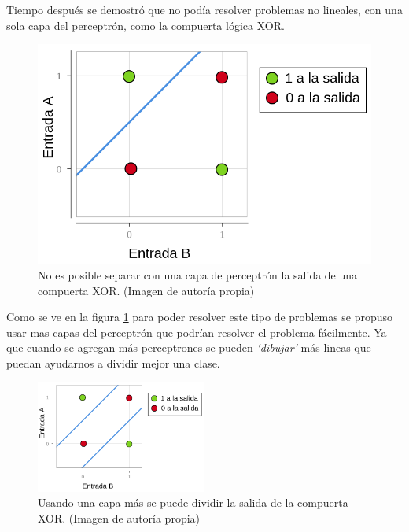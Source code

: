\par Tiempo después se demostró que no podía resolver problemas no lineales, con una sola capa del perceptrón, como la compuerta lógica XOR. 
\begin{figure}[H]
	\begin{minipage}{0.5\textwidth}
		
	\end{minipage}%
	\begin{minipage}{0.5\textwidth}
		\includegraphics[width=\textwidth]{imagenes/diagramaXor.png}
	\end{minipage}
	\caption{No es posible separar con una capa de perceptrón la salida de una compuerta XOR. (Imagen de autoría propia)}
	\label{fig:xor}
\end{figure}
		       
		       
\par Como se ve en la figura \ref{fig:xor} para poder resolver este tipo de problemas se propuso usar mas capas del perceptrón que podrían resolver el problema fácilmente. Ya que cuando se agregan más perceptrones se pueden \textit{`dibujar'} más lineas que puedan ayudarnos a dividir mejor una clase.
		    
\begin{figure}[H]
	\centering
	\includegraphics[width=0.5\textwidth]{imagenes/diagramaXor2.png}
	\caption{Usando una capa más se puede dividir la salida de la compuerta XOR. (Imagen de autoría propia)}
	\label{fig:xor2}
\end{figure}
		    
